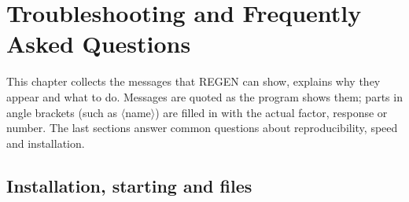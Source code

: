 \chapter{Troubleshooting and Frequently Asked Questions}\label{chap:12}
\label{ch:trouble}

This chapter collects the messages that REGEN can show, explains why they appear and what to do. Messages are
quoted as the program shows them; parts in angle brackets (such as $\langle$name$\rangle$) are filled in with the
actual factor, response or number. The last sections answer common questions about reproducibility, speed and
installation.

\section{Installation, starting and files}
\label{sec:ch12-files}

